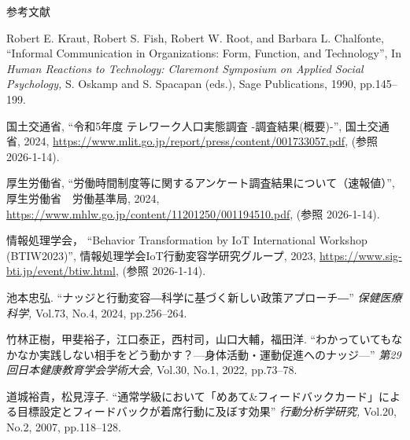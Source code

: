 \thispagestyle{myheadings}

\begin{thebibliography}{参考文献}




  Robert E. Kraut, Robert S. Fish, Robert W. Root, and Barbara L. Chalfonte,
  ``Informal Communication in Organizations: Form, Function, and Technology'',
  In {\sl Human Reactions to Technology: Claremont Symposium on Applied Social Psychology,}
  S. Oskamp and S. Spacapan (eds.),
  Sage Publications,
  1990,
  pp.145--199.

  国土交通省,
  ``令和5年度 テレワーク人口実態調査 -調査結果(概要)-'',
  国土交通省,
  2024,
  \url{https://www.mlit.go.jp/report/press/content/001733057.pdf},
  (参照 2026-1-14).

  厚生労働省,
  ``労働時間制度等に関するアンケート調査結果について（速報値）'',
  厚生労働省　労働基準局,
  2024,
  \url{https://www.mhlw.go.jp/content/11201250/001194510.pdf},
  (参照 2026-1-14).


  情報処理学会，
  ``Behavior Transformation by IoT International Workshop (BTIW2023)'',
  情報処理学会IoT行動変容学研究グループ,
  2023,
  \url{https://www.sig-bti.jp/event/btiw.html},
  (参照 2026-1-14).

  池本忠弘.
  ``ナッジと行動変容―科学に基づく新しい政策アプローチ―''
  {\sl 保健医療科学,}
  Vol.73,
  No.4,
  2024,
  pp.256--264.

  竹林正樹，甲斐裕子，江口泰正，西村司，山口大輔，福田洋.
  ``わかっていてもなかなか実践しない相手をどう動かす？—身体活動・運動促進へのナッジ—''
  {\sl 第29 回日本健康教育学会学術大会,}
  Vol.30,
  No.1,
  2022,
  pp.73--78.

  道城裕貴，松見淳子.
  ``通常学級において「めあて\&フィードバックカード」による目標設定とフィードバックが着席行動に及ぼす効果''
  {\sl 行動分析学研究,}
  Vol.20,
  No.2,
  2007,
  pp.118--128.


\end{thebibliography}
